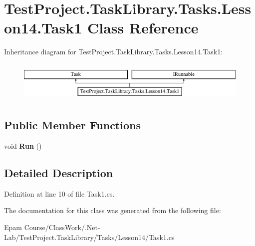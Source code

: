 \hypertarget{class_test_project_1_1_task_library_1_1_tasks_1_1_lesson14_1_1_task1}{}\section{Test\+Project.\+Task\+Library.\+Tasks.\+Lesson14.\+Task1 Class Reference}
\label{class_test_project_1_1_task_library_1_1_tasks_1_1_lesson14_1_1_task1}
Inheritance diagram for Test\+Project.\+Task\+Library.\+Tasks.\+Lesson14.\+Task1\+:\begin{figure}[H]
\begin{center}
\leavevmode
\includegraphics[height=1.964912cm]{class_test_project_1_1_task_library_1_1_tasks_1_1_lesson14_1_1_task1}
\end{center}
\end{figure}
\subsection*{Public Member Functions}
\begin{DoxyCompactItemize}
\item 
\mbox{\label{class_test_project_1_1_task_library_1_1_tasks_1_1_lesson14_1_1_task1_a7ebbd4a957a2b137da2969024edefb89}} 
void {\bfseries Run} ()
\end{DoxyCompactItemize}


\subsection{Detailed Description}


Definition at line 10 of file Task1.\+cs.



The documentation for this class was generated from the following file\+:\begin{DoxyCompactItemize}
\item 
Epam Course/\+Class\+Work/.\+Net-\/\+Lab/\+Test\+Project.\+Task\+Library/\+Tasks/\+Lesson14/Task1.\+cs\end{DoxyCompactItemize}
